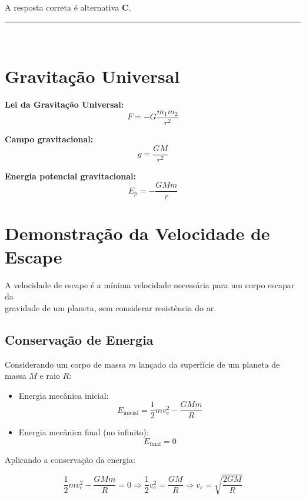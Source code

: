\documentclass[a4paper,12pt]{article}
\begin{document}
\begin{flushleft}
A resposta correta é alternativa \colorbox{green!50}{\textbf{C}}.
\end{flushleft}

\noindent\rule{\linewidth}{0.6pt}\\

\section*{Gravitação Universal}

\textbf{Lei da Gravitação Universal:}
\begin{equation*}
  F = -G \frac{m_1 m_2}{r^2}
\end{equation*}

\textbf{Campo gravitacional:}
\begin{equation*}
  g = \frac{G M}{r^2}
\end{equation*}

\textbf{Energia potencial gravitacional:}
\begin{equation*}
  E_p = -\frac{G M m}{r}
\end{equation*}

\section*{Demonstração da Velocidade de Escape}

\colorbox{green!40}{A velocidade de escape é a mínima velocidade necessária para um corpo escapar da} \\
\colorbox{green!40}{gravidade de um planeta,} sem considerar resistência do ar.

\subsection*{Conservação de Energia}

Considerando um corpo de massa $m$ lançado da superfície de um planeta de massa $M$ e raio $R$:

\begin{itemize}
  \item Energia mecânica inicial:
  \[
  E_{\text{inicial}} = \frac{1}{2}mv^{2}_{e} - \frac{GMm}{R}
  \]
  \item Energia mecânica final (no infinito): 
  \[
  E_{\text{final}} = 0
  \]
\end{itemize}

Aplicando a conservação da energia:

\[
\frac{1}{2}mv^2_{e} - \frac{GMm}{R} = 0
\Rightarrow \frac{1}{2}v^2_{e} = \frac{GM}{R}
\Rightarrow v_{e} = \sqrt{\frac{2GM}{R}}
\]
\end{document}
